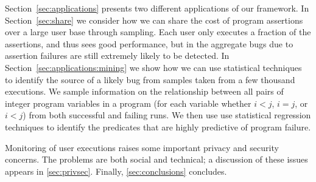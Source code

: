 Section~\ref{sec:applications} presents two different applications of
our framework.  In Section~\ref{sec:share} we consider how we can
share the cost of program assertions over a large user base through
sampling.  Each user only executes a fraction of the assertions, and
thus sees good performance, but in the aggregate bugs due to assertion
failures are still extremely likely to be detected.  In
Section~\ref{sec:applications:mining} we show how we can use
statistical techniques to identify the source of a likely bug from
samples taken from a few thousand executions.  We sample information
on the relationship between all pairs of integer program variables in
a program (for each variable whether $i < j$, $i = j$, or $i < j$)
from both successful and failing runs.  We then use use statistical
regression techniques to identify the predicates that are highly
predictive of program failure.

Monitoring of user executions raises some important
privacy and security concerns.  The problems are both social and technical; 
a discussion of these issues appears in \autoref{sec:privsec}.
Finally, \autoref{sec:conclusions} concludes.


